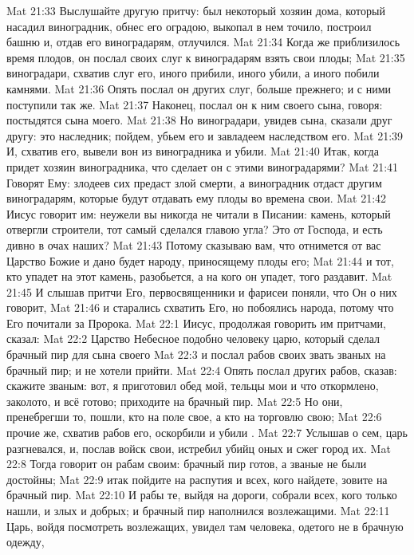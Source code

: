 \rsbpar\vs Mat 21:33 Выслушайте другую притчу: был некоторый хозяин дома, который насадил виноградник, обнес его оградою, выкопал в нем точило, построил башню и, отдав его виноградарям, отлучился.
\vs Mat 21:34 Когда же приблизилось время плодов, он послал своих слуг к виноградарям взять свои плоды;
\vs Mat 21:35 виноградари, схватив слуг его, иного прибили, иного убили, а иного побили камнями.
\vs Mat 21:36 Опять послал он других слуг, больше прежнего; и с ними поступили так же.
\vs Mat 21:37 Наконец, послал он к ним своего сына, говоря: постыдятся сына моего.
\vs Mat 21:38 Но виноградари, увидев сына, сказали друг другу: это наследник; пойдем, убьем его и завладеем наследством его.
\vs Mat 21:39 И, схватив его, вывели вон из виноградника и убили.
\vs Mat 21:40 Итак, когда придет хозяин виноградника, что сделает он с этими виноградарями?
\vs Mat 21:41 Говорят Ему: злодеев сих предаст злой смерти, а виноградник отдаст другим виноградарям, которые будут отдавать ему плоды во времена свои.
\vs Mat 21:42 Иисус говорит им: неужели вы никогда не читали в Писании: камень, который отвергли строители, тот самый сделался главою угла? Это от Господа, и есть дивно в очах наших?
\vs Mat 21:43 Потому сказываю вам, что отнимется от вас Царство Божие и дано будет народу, приносящему плоды его;
\vs Mat 21:44 и тот, кто упадет на этот камень, разобьется, а на кого он упадет, того раздавит.
\vs Mat 21:45 И слышав притчи Его, первосвященники и фарисеи поняли, что Он о них говорит,
\vs Mat 21:46 и старались схватить Его, но побоялись народа, потому что Его почитали за Пророка.
\vs Mat 22:1 Иисус, продолжая говорить им притчами, сказал:
\vs Mat 22:2 Царство Небесное подобно человеку царю, который сделал брачный пир для сына своего
\vs Mat 22:3 и послал рабов своих звать званых на брачный пир; и не хотели прийти.
\vs Mat 22:4 Опять послал других рабов, сказав: скажите званым: вот, я приготовил обед мой, тельцы мои и что откормлено, заколото, и всё готово; приходите на брачный пир.
\vs Mat 22:5 Но они, пренебрегши то, пошли, кто на поле свое, а кто на торговлю свою;
\vs Mat 22:6 прочие же, схватив рабов его, оскорбили и убили .
\vs Mat 22:7 Услышав о сем, царь разгневался, и, послав войск свои, истребил убийц оных и сжег город их.
\vs Mat 22:8 Тогда говорит он рабам своим: брачный пир готов, а званые не были достойны;
\vs Mat 22:9 итак пойдите на распутия и всех, кого найдете, зовите на брачный пир.
\vs Mat 22:10 И рабы те, выйдя на дороги, собрали всех, кого только нашли, и злых и добрых; и брачный пир наполнился возлежащими.
\vs Mat 22:11 Царь, войдя посмотреть возлежащих, увидел там человека, одетого не в брачную одежду,
